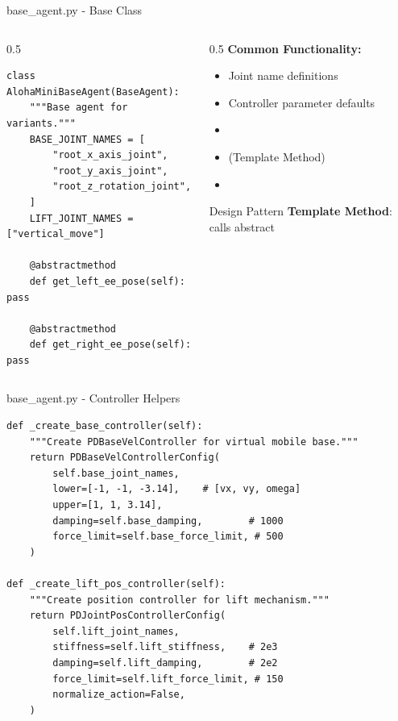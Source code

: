 \begin{frame}[fragile]{base\_agent.py - Base Class}
\begin{columns}
\begin{column}{0.5\textwidth}
\begin{lstlisting}[basicstyle=\ttfamily\scriptsize]
class AlohaMiniBaseAgent(BaseAgent):
    """Base agent for variants."""
    BASE_JOINT_NAMES = [
        "root_x_axis_joint",
        "root_y_axis_joint",
        "root_z_rotation_joint",
    ]
    LIFT_JOINT_NAMES = ["vertical_move"]

    @abstractmethod
    def get_left_ee_pose(self): pass

    @abstractmethod
    def get_right_ee_pose(self): pass
\end{lstlisting}
\end{column}
\begin{column}{0.5\textwidth}
    \textbf{Common Functionality:}
    \begin{itemize}
        \item Joint name definitions
        \item Controller parameter defaults
        \item {}
        \item {} (Template Method)
        \item {}
    \end{itemize}

    \vspace{0.2cm}

    \begin{block}{Design Pattern}
    \footnotesize\textbf{Template Method}:  calls abstract 
    \end{block}
\end{column}
\end{columns}
\end{frame}

\begin{frame}[fragile]{base\_agent.py - Controller Helpers}
\begin{lstlisting}
def _create_base_controller(self):
    """Create PDBaseVelController for virtual mobile base."""
    return PDBaseVelControllerConfig(
        self.base_joint_names,
        lower=[-1, -1, -3.14],    # [vx, vy, omega]
        upper=[1, 1, 3.14],
        damping=self.base_damping,        # 1000
        force_limit=self.base_force_limit, # 500
    )

def _create_lift_pos_controller(self):
    """Create position controller for lift mechanism."""
    return PDJointPosControllerConfig(
        self.lift_joint_names,
        stiffness=self.lift_stiffness,    # 2e3
        damping=self.lift_damping,        # 2e2
        force_limit=self.lift_force_limit, # 150
        normalize_action=False,
    )
\end{lstlisting}
\end{frame}

